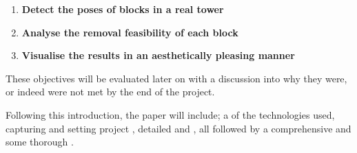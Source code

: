 \begin{enumerate}
    \item\label{obj:detect} \textbf{Detect the poses of blocks in a real tower}
    \item\label{obj:analysis} \textbf{Analyse the removal feasibility of each block}
    \item\label{obj:display} \textbf{Visualise the results in an aesthetically pleasing manner}
\end{enumerate}

These objectives will be evaluated later on with a discussion into why they were, or indeed were not met by the end of the project.

Following this introduction, the paper will include; a  of the technologies used, capturing and setting project , detailed  and , all followed by a comprehensive  and some thorough .




